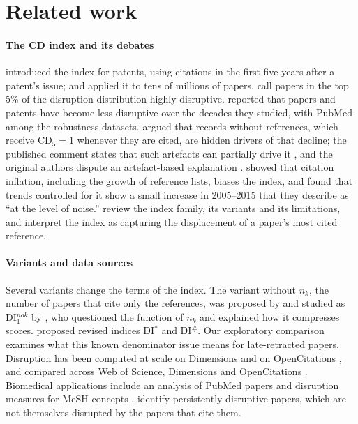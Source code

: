 \section{Related work}\label{sec:related}

\paragraph{The CD index and its debates} \citet{funk2017dynamic} introduced the index for patents, using citations in
the first five years after a patent's issue; \citet{wu2019large} and \citet{park2023papers} applied it to tens of
millions of papers. \citet{wu2019large} call papers in the top 5\% of the disruption distribution highly disruptive.
\citet{park2023papers} reported that papers and patents have become less disruptive over the decades they studied,
with PubMed among the robustness datasets. \citet{holst2024artefacts} argued that records without references, which
receive CD$_5 = 1$ whenever they are cited, are hidden drivers of that decline; the published comment states that such
artefacts can partially drive it \citep{holst2026partially}, and the original authors dispute an artefact-based
explanation \citep{park2025robust,park2026reply}. \citet{petersen2024inflation} showed that citation inflation,
including the growth of reference lists, biases the index, and \citet{petersen2025reanalysis} found that trends
controlled for it show a small increase in 2005--2015 that they describe as ``at the level of noise.''
\citet{leibel2023overview} review the index
family, its variants and its limitations, and \citet{lin2026displacement} interpret the index as capturing the
displacement of a paper's most cited reference.

\paragraph{Variants and data sources} Several variants change the terms of the index. The variant without $n_k$, the
number of papers that cite only the references, was proposed by \citet{wuyan2019solo} and studied as DI$_1^{nok}$ by
\citet{bornmann2020convergent}, who questioned the function of $n_k$ and explained how it compresses scores.
\citet{leydesdorff2021revision} proposed revised indices DI$^*$ and DI$^\#$.
Our exploratory comparison examines what this known denominator issue means for late-retracted papers.
Disruption has been computed at scale on Dimensions \citep{sixt2024dimensions} and on
OpenCitations \citep{jiang2024opencitations}, and compared across Web of Science, Dimensions and OpenCitations
\citep{xu2025alternative,crossdi2025}. Biomedical applications include an analysis of PubMed papers
\citep{sheng2023prior} and disruption measures for MeSH concepts \citep{copara2024mesh}. \citet{deng2025persistent}
identify persistently disruptive papers, which are not themselves disrupted by the papers that cite them.

